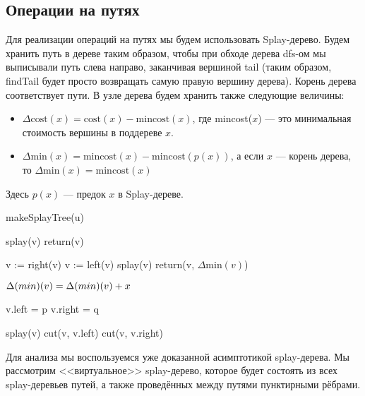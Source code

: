 \subsection{Операции на путях}

Для реализации операций на путях мы будем использовать Splay-дерево. Будем хранить путь в дереве таким образом, чтобы при обходе дерева dfs-ом мы выписывали путь слева направо, заканчивая вершиной tail (таким образом, findTail будет просто возвращать самую правую вершину дерева). Корень дерева соответствует пути. В узле дерева будем хранить также следующие величины:

\begin{itemize}
	\item $\Delta \text{cost}(x) = \text{cost}(x) - \text{mincost}(x)$, где mincost($x$) --- это минимальная стоимость вершины в поддереве $x$.
	\item $\Delta \text{min}(x) = \text{mincost}(x) - \text{mincost}(p(x))$, а если $x$ --- корень дерева, то $\Delta \text{min}(x) = \text{mincost}(x)$
\end{itemize}

Здесь $p(x)$ --- предок $x$ в Splay-дереве.

\begin{algorithmic}[1]
		\State makeSplayTree(u)
	\EndProcedure

		\State splay(v)
		\State return(v)
	\EndProcedure

				\State v := right(v)
			\Else
				\State v := left(v)
			\EndIf
		\EndWhile
		\State splay(v)
		\State return(v, $\Delta \text{min}(v)$)
	\EndProcedure

		\State $\Delta \text(min)(v) = \Delta \text(min)(v) + x$
	\EndProcedure

		\State v.left = p
		\State v.right = q
	\EndProcedure

		\State splay(v)
		\State cut(v, v.left)
		\State cut(v, v.right)
	\EndProcedure

\end{algorithmic}

Для анализа мы воспользуемся уже доказанной асимптотикой splay-дерева. Мы рассмотрим <<виртуальное>> splay-дерево, которое будет состоять из всех splay-деревьев путей, а также проведённых между путями пунктирными рёбрами.

